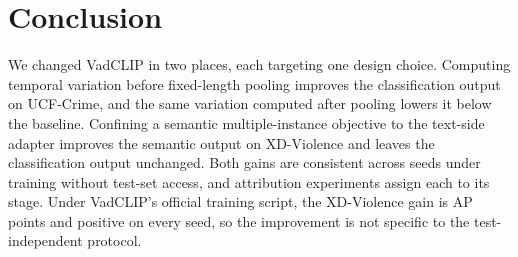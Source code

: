 
\section{Conclusion}
\label{sec:conclusion}

We changed VadCLIP in two places, each targeting one design choice. Computing temporal variation before fixed-length pooling improves the classification output on UCF-Crime, and the same variation computed after pooling lowers it below the baseline. Confining a semantic multiple-instance objective to the text-side adapter improves the semantic output on XD-Violence and leaves the classification output unchanged. Both gains are consistent across seeds under training without test-set access, and attribution experiments assign each to its stage. Under VadCLIP's official training script, the XD-Violence gain is \offGainMean{} AP points and positive on every seed, so the improvement is not specific to the test-independent protocol.
